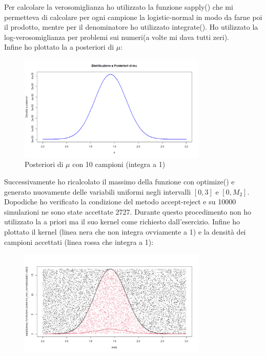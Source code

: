 \documentclass[a4paper,12pt]{article}
\begin{document}
\begin{itemize}
	Per calcolare la verosomiglianza ho utilizzato la funzione sapply() che mi permetteva di calcolare per ogni campione la logistic-normal in modo da farne poi il prodotto, mentre per il denominatore ho utilizzato integrate(). Ho utilizzato la log-verosomiglianza per problemi sui numeri(a volte mi dava tutti zeri).\\
	Infine ho plottato la a posteriori di $\mu$:
	\begin{figure}[h] %
		\centering %
		\includegraphics[width=0.8\textwidth]{post.png} %
		\caption{Posteriori di $\mu$ con 10 campioni (integra a 1)} %
		\label{fig:immagine} %
	\end{figure}
	\newpage
	Successivamente ho ricalcolato il massimo della funzione con optimize() e generato nuovamente delle variabili uniformi negli intervalli $[0,3]$ e $[0,M_2]$. Dopodiche ho verificato la condizione del metodo accept-reject e su 10000 simulazioni ne sono state accettate 2727. Durante questo procedimento non ho utilizzato la a priori ma il suo kernel come richiesto dall'esercizio. Infine ho plottato il kernel (linea nera che non integra ovviamente a 1) e la densità dei campioni accettati (linea rossa che integra a 1):
	\begin{figure}[h] %
		\centering %
		\includegraphics[width=0.8\textwidth]{post2.png} %

\end{figure}
\end{itemize}
\end{document}

